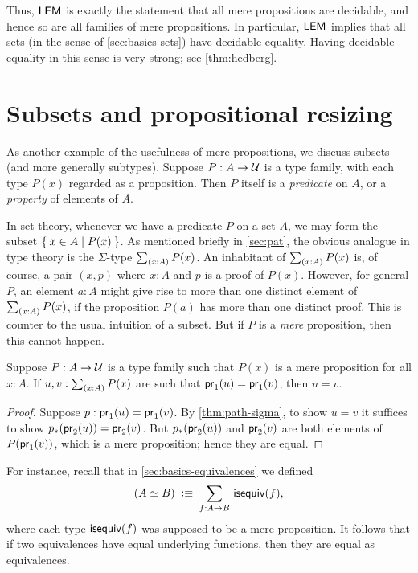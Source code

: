 Thus, $\mathsf{LEM}_{}$ is exactly the statement that all mere propositions are decidable, and hence so are all families of mere propositions.
In particular, $\mathsf{LEM}_{}$ implies that all sets (in the sense of \autoref{sec:basics-sets}) have decidable equality.
Having decidable equality in this sense is very strong; see \autoref{thm:hedberg}.

%
%

\section{Subsets and propositional resizing}
\label{subsec:prop-subsets}

%

As another example of the usefulness of mere propositions, we discuss subsets (and more generally subtypes).
Suppose $P:A\to\mathcal{U}$ is a type family, with each type $P(x)$ regarded as a proposition.
Then $P$ itself is a \emph{predicate} on $A$, or a \emph{property} of elements of $A$.

In set theory, whenever we have a predicate $P$ on a set $A$, we may form the subset $\Set{x\in A | P(x)}$.
As mentioned briefly in \autoref{sec:pat}, the obvious analogue in type theory is the $\Sigma$-type $\sm{x:A} P(x)$.
An inhabitant of $\sm{x:A} P(x)$ is, of course, a pair $(x,p)$ where $x:A$ and $p$ is a proof of $P(x)$.
However, for general $P$, an element $a:A$ might give rise to more than one distinct element of $\sm{x:A} P(x)$, if the proposition $P(a)$ has more than one distinct proof.
This is counter to the usual intuition of a subset.
But if $P$ is a \emph{mere} proposition, then this cannot happen.

\begin{lem}\label{thm:path-subset}
  Suppose $P:A\to\mathcal{U}$ is a type family such that $P(x)$ is a mere proposition for all $x:A$.
  If $u,v:\sm{x:A} P(x)$ are such that $\mathsf{pr}_{1}(u) = \mathsf{pr}_{1}(v)$, then $u=v$.
\end{lem}
\begin{proof}
  Suppose $p:\mathsf{pr}_{1}(u) = \mathsf{pr}_{1}(v)$.
  By \autoref{thm:path-sigma}, to show $u=v$ it suffices to show ${p}_{*}\mathopen{}\left({\mathsf{pr}_{2}(u)}\right)\mathclose{} = \mathsf{pr}_{2}(v)$.
  But ${p}_{*}\mathopen{}\left({\mathsf{pr}_{2}(u)}\right)\mathclose{}$ and $\mathsf{pr}_{2}(v)$ are both elements of $P(\mathsf{pr}_{1}(v))$, which is a mere proposition; hence they are equal.
\end{proof}

For instance, recall that in \autoref{sec:basics-equivalences} we defined
\[(\eqv A B) \;\defeq\; \sm{f:A\to B} \isequiv (f),\]
where each type $\mathsf{isequiv} (f)$ was supposed to be a mere proposition.
It follows that if two equivalences have equal underlying functions, then they are equal as equivalences.


